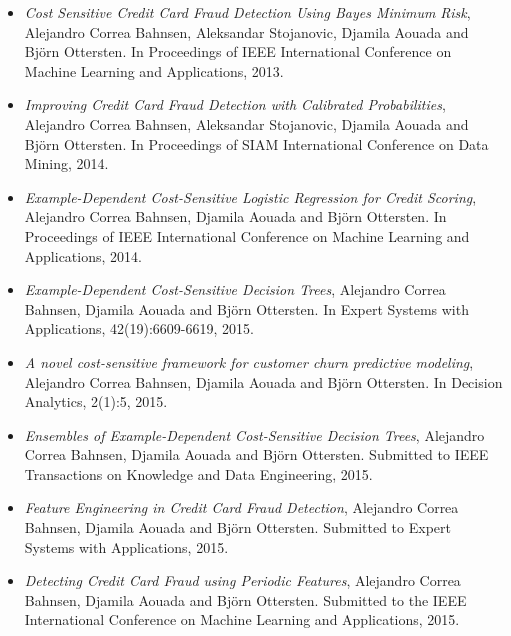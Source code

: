 \begin{itemize}
\item \citep{CorreaBahnsen2013} \textit{Cost Sensitive Credit Card Fraud Detection Using Bayes 
Minimum Risk}, Alejandro Correa Bahnsen,  Aleksandar Stojanovic, Djamila Aouada and Bj\"orn 
Ottersten. In Proceedings of IEEE International Conference on Machine Learning and Applications, 
2013.

\item \citep{CorreaBahnsen2014} \textit{Improving Credit Card Fraud Detection with Calibrated 
Probabilities}, Alejandro Correa Bahnsen, Aleksandar Stojanovic, Djamila Aouada and Bj\"orn 
Ottersten. In Proceedings of SIAM International Conference on Data Mining, 2014.

\item \citep{CorreaBahnsen2014b} \textit{Example-Dependent Cost-Sensitive Logistic Regression for 
Credit Scoring}, Alejandro Correa Bahnsen, Djamila Aouada and Bj\"orn Ottersten.
In Proceedings of IEEE International Conference on Machine Learning and Applications, 2014.

\item \citep{CorreaBahnsen2015} \textit{Example-Dependent Cost-Sensitive Decision Trees},
Alejandro Correa Bahnsen, Djamila Aouada and Bj\"orn Ottersten.
In Expert Systems with Applications, 42(19):6609-6619, 2015.

\item \citep{CorreaBahnsen2015a} \textit{A novel cost-sensitive framework for customer churn 
predictive modeling}, Alejandro Correa Bahnsen, Djamila Aouada and Bj\"orn Ottersten.
In Decision Analytics, 2(1):5, 2015.

\item \citep{CorreaBahnsen2015b} \textit{Ensembles of Example-Dependent Cost-Sensitive Decision 
Trees}, Alejandro Correa Bahnsen, Djamila Aouada and Bj\"orn Ottersten.
Submitted to IEEE Transactions on Knowledge and Data Engineering, 2015.

\item \citep{CorreaBahnsen2015c} \textit{Feature Engineering in Credit Card Fraud Detection},
Alejandro Correa Bahnsen, Djamila Aouada and Bj\"orn Ottersten. Submitted to Expert Systems with 
Applications, 2015.

\newpage
\item \citep{CorreaBahnsen2015d} \textit{Detecting Credit Card Fraud using Periodic Features}, 
Alejandro Correa Bahnsen, Djamila Aouada and Bj\"orn Ottersten.
Submitted to the IEEE International Conference on Machine Learning and Applications, 2015.


\end{itemize}


